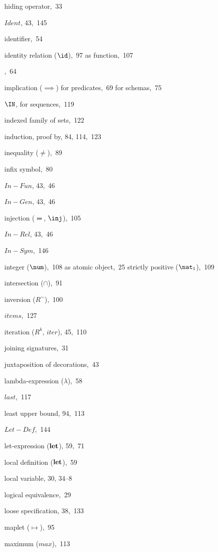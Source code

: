 \begin{theindex}
\item hiding operator,~33
\indexspace %
\item \(Ident\), 43,~145
\item identifier,~54
\item identity relation ($\id$),~97
  \subitem as function,~107
\item \IFTHENELSE,~64
\item implication ($\implies$)
  \subitem for predicates,~69
  \subitem for schemas,~75
\item $\IN$, for sequences,~119
\item indexed family of sets,~122
\item induction, proof by, 84, 114,~123
\item inequality ($\neq$),~89
\item infix symbol,~80
\item \(In-Fun\), 43,~46
\item \(In-Gen\), 43,~46
\item injection ($\pinj$, $\inj$),~105
\item \(In-Rel\), 43,~46
\item \(In-Sym\),~146
\item integer ($\num$),~108
  \subitem as atomic object,~25
  \subitem strictly positive ($\nat_1$),~109
\item intersection ($\cap$),~91
\item inversion ($R^\sim$),~100
\item $items$,~127
\item iteration ($R^k$, $iter$), 45,~110
\indexspace %
\item joining signatures,~31
\item juxtaposition of decorations,~43
\indexspace %
\item lambda-expression ($\lambda$),~58
\item $last$,~117
\item least upper bound, 94,~113
\item \(Let-Def\),~144
\item let-expression ($\bf let$), 59,~71
\item local definition ($\bf let$),~59
\item local variable, 30, 34--8
\item logical equivalence,~29
\item loose specification, 38,~133
\indexspace %
\item maplet ($\mapsto$),~95
\item maximum ($max$),~113

\end{theindex}
